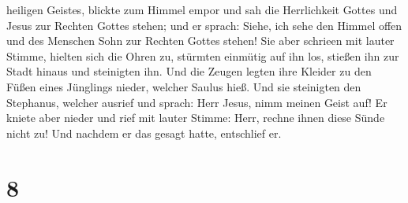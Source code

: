 heiligen Geistes, blickte zum Himmel empor und sah die Herrlichkeit
Gottes und Jesus zur Rechten Gottes stehen;  und er
sprach: Siehe, ich sehe den Himmel offen und des Menschen Sohn zur
Rechten Gottes stehen!  Sie aber schrieen mit lauter
Stimme, hielten sich die Ohren zu, stürmten einmütig auf ihn los,
stießen ihn zur Stadt hinaus und steinigten ihn.  Und die
Zeugen legten ihre Kleider zu den Füßen eines Jünglings nieder, welcher
Saulus hieß.  Und sie steinigten den Stephanus, welcher
ausrief und sprach: Herr Jesus, nimm meinen Geist auf! 
Er kniete aber nieder und rief mit lauter Stimme: Herr, rechne ihnen
diese Sünde nicht zu! Und nachdem er das gesagt hatte, entschlief er.

\hypertarget{section-7}{%
\section{8}\label{section-7}}

